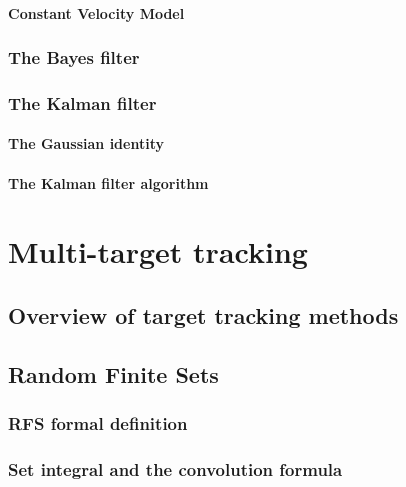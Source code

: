 \documentclass[english,master,unicode]{ctufit-thesis}
\theoremstyle{plain}
\theoremstyle{definition}
\theoremstyle{remark}
\numberwithin{theorem}{chapter}
\begin{document}
            \subsubsection{Constant Velocity Model}\label{sec:cv-model}
                
        \subsection{The Bayes filter}\label{sec:bayes-filter}
            
        \subsection{The Kalman filter}\label{sec:kf-index}
            
            \subsubsection{The Gaussian identity}\label{sec:gaussian-identity}
                
            \subsubsection{The Kalman filter algorithm}\label{sec:kf-algorithm}
                

\chapter{Multi-target tracking}\label{ch:mtt}
    
    \section{Overview of target tracking methods}\label{sec:tt-overview}
        
    \section{Random Finite Sets}\label{sec:fisst}
        
        \subsection{RFS formal definition}\label{sec:rfs-definition}
            
        \subsection{Set integral and the convolution formula}\label{sec:rfs-integral-convolution}
            
\end{document}
